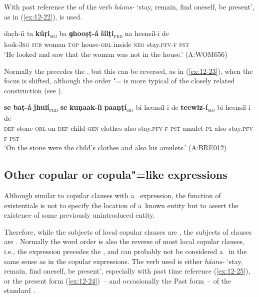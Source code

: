 With past  reference the  of the verb \textit{háans-} `stay, remain, find oneself, be present', as in (\ref{ex:12-22}), is used.

\begin{exe}
\ex
\label{ex:12-22}
\gll dac̣h-íi ta {\ob}\textbf{kúṛi}{\cb}\textsubscript{\textsc{\upshape sbj}} ba {\ob}\textbf{ɡhooṣṭ-á} \textbf{šíiṭi}{\cb}\textsubscript{\textsc{\upshape prd}} na heensíl-i de \\
look-3\textsc{sg} \textsc{sub} woman \textsc{top} house-\textsc{obl} inside \textsc{neg} stay.\textsc{pfv-f} \textsc{pst} \\
\glt `He looked and saw that the woman was not in the house.' (A:WOM656)
\end{exe}

Normally the  precedes the   , but this can be reversed, as in (\ref{ex:12-23}), when the focus is shifted, although the order "= is more typical of the closely related  construction (see ).

\begin{exe}
\ex
\label{ex:12-23}
\gll {\ob}\textbf{se} \textbf{baṭ-á} \textbf{ǰhulí}{\cb}\textsubscript{\textsc{\upshape prd}} {\ob}\textbf{se} \textbf{kuṇaak-íi} \textbf{paaṇṭí}{\cb}\textsubscript{\textsc{\upshape sbj}} bi heensíl-i de {\ob}\textbf{teewiz-í}{\cb}\textsubscript{\textsc{\upshape sbj}} bi heensíl-i de\\
\textsc{def} stone-\textsc{obl} on \textsc{def} child-\textsc{gen} clothes  also stay.\textsc{pfv-f}
\textsc{pst} amulet-\textsc{pl} also stay.\textsc{pfv-f} \textsc{pst}\\
\glt `On the stone were the child's clothes and also his amulets.' (A:BRE012)
\end{exe}

\subsection{Other copular or {copula}"=like expressions}
\label{subsec:12-1-4}

 Although similar to copular clauses with a~ expression, the function of existentials is not to specify the location of a~known entity but to assert the existence of some previously unintroduced entity. 


Therefore, while the subjects of local copular clauses are , the subjects of  clauses are . Normally the word order is also the reverse of most local copular clauses, i.e., the  expression precedes the   , and can probably not be considered a~ in the same sense as in the copular  expressions. The verb used is either \textit{háans-} `stay, remain, find oneself, be present', especially with past time reference (\ref{ex:12-25}), or the present form (\ref{ex:12-24})~-- and occasionally the Past form~-- of the standard .


